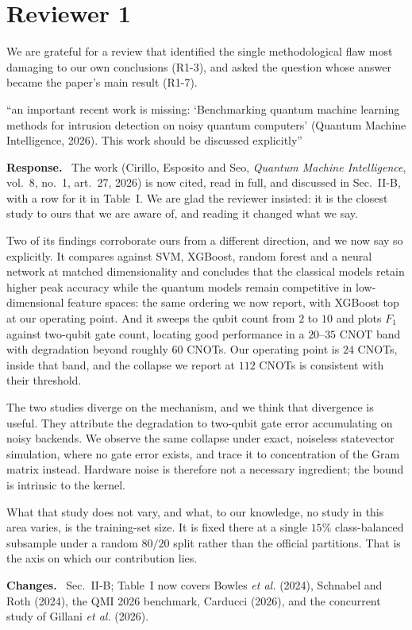 \documentclass[11pt,a4paper]{article}
\newenvironment{revcomment}
  {\par\addvspace{6pt}\begingroup
   \color{quotegray}\itshape\small
   \begin{list}{}{%
     \setlength{\leftmargin}{1.8em}\setlength{\rightmargin}{1.0em}%
     \setlength{\topsep}{0pt}\setlength{\partopsep}{0pt}%
     \setlength{\parsep}{3pt}\setlength{\itemsep}{0pt}}%
   \item[]}
  {\end{list}\endgroup\normalcolor\addvspace{6pt}}
\newcommand{\itemhead}[2]{%
  \par\addvspace{15pt}%
  \noindent{\bfseries\color{tagink}#1}\hspace{0.7em}{\bfseries #2}%
  \par\addvspace{3.5pt}%
  \noindent{\color{rulegray}\rule{\linewidth}{0.5pt}}%
  \par\addvspace{5pt}%
  \nobreak}
\newcommand{\resp}{\par\addvspace{2pt}\noindent\textbf{Response.}\ }
\newcommand{\changed}{\par\addvspace{5pt}\noindent
  {\bfseries\color{tagink}Changes.}\ }
\begin{document}
\section{Reviewer 1}

We are grateful for a review that identified the single methodological flaw
most damaging to our own conclusions (R1-3), and asked the question whose answer
became the paper's main result (R1-7).

\itemhead{R1-1}{Missing QMI 2026 benchmark; Table~I needs 2025--2026 literature}
\begin{revcomment}
``an important recent work is missing: `Benchmarking quantum machine learning
methods for intrusion detection on noisy quantum computers' (Quantum Machine
Intelligence, 2026). This work should be discussed explicitly''
\end{revcomment}
\resp
The work (Cirillo, Esposito and Seo, \emph{Quantum Machine Intelligence},
vol.~8, no.~1, art.~27, 2026) is now cited, read in full, and discussed in
Sec.~II-B, with a row for it in Table~I. We are glad the reviewer insisted: it
is the closest study to ours that we are aware of, and reading it changed what
we say.

Two of its findings corroborate ours from a different direction, and we now say
so explicitly. It compares against SVM, XGBoost, random forest and a neural
network at matched dimensionality and concludes that the classical models retain
higher peak accuracy while the quantum models remain competitive in
low-dimensional feature spaces: the same ordering we now report, with XGBoost
top at our operating point. And it sweeps the qubit count from $2$ to $10$ and
plots $F_1$ against two-qubit gate count, locating good performance in a
$20$--$35$ CNOT band with degradation beyond roughly $60$ CNOTs. Our operating
point is $24$ CNOTs, inside that band, and the collapse we report at $112$ CNOTs
is consistent with their threshold.

The two studies diverge on the mechanism, and we think that divergence is
useful. They attribute the degradation to two-qubit gate error accumulating on
noisy backends. We observe the same collapse under exact, noiseless statevector
simulation, where no gate error exists, and trace it to concentration of the
Gram matrix instead. Hardware noise is therefore not a necessary ingredient; the
bound is intrinsic to the kernel.

What that study does not vary, and what, to our knowledge, no study in this
area varies, is the training-set size. It is fixed there at a single $15\%$
class-balanced subsample under a random $80/20$ split rather than the official
partitions. That is the axis on which our contribution lies.
\changed
Sec.~II-B; Table~I now covers Bowles \emph{et al.} (2024), Schnabel and Roth
(2024), the QMI 2026 benchmark, Carducci (2026), and the concurrent study of
Gillani \emph{et al.} (2026).
\end{document}
